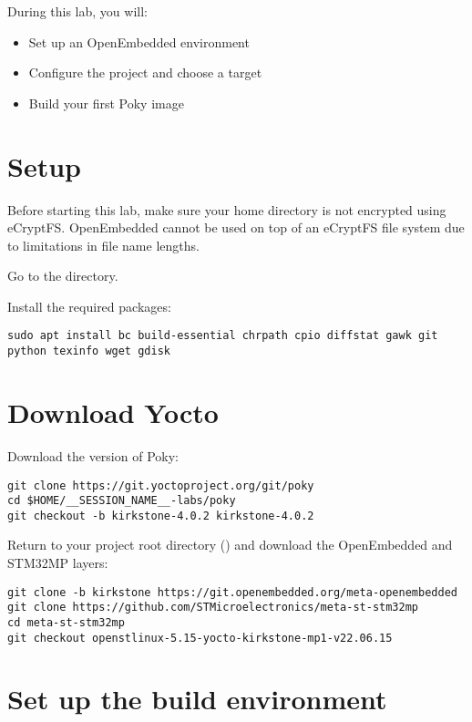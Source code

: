 
During this lab, you will:
\begin{itemize}
  \item Set up an OpenEmbedded environment
  \item Configure the project and choose a target
  \item Build your first Poky image
\end{itemize}

\section{Setup}

Before starting this lab, make sure your home directory is not
encrypted using eCryptFS. OpenEmbedded cannot be used on top of an eCryptFS file
system due to limitations in file name lengths.

Go to the  directory.

Install the required packages:
\begin{verbatim}
sudo apt install bc build-essential chrpath cpio diffstat gawk git python texinfo wget gdisk
\end{verbatim}

\section{Download Yocto}

Download the  version of Poky:
\begin{verbatim}
git clone https://git.yoctoproject.org/git/poky
cd $HOME/__SESSION_NAME__-labs/poky
git checkout -b kirkstone-4.0.2 kirkstone-4.0.2
\end{verbatim}

Return to your project root directory ()
and download the OpenEmbedded and STM32MP layers:
\begin{verbatim}
git clone -b kirkstone https://git.openembedded.org/meta-openembedded
git clone https://github.com/STMicroelectronics/meta-st-stm32mp
cd meta-st-stm32mp
git checkout openstlinux-5.15-yocto-kirkstone-mp1-v22.06.15
\end{verbatim}

\section{Set up the build environment}

